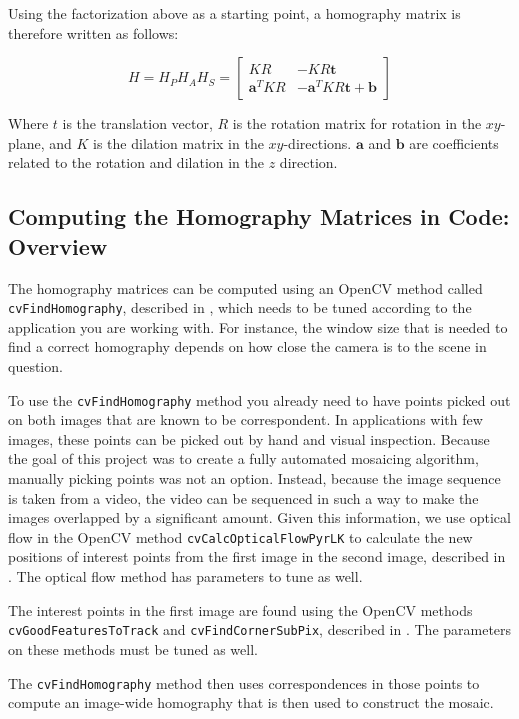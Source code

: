 \documentclass{article}
\begin{document}
Using the factorization above as a starting point, a homography matrix is
therefore written as follows:

\[H = H_P H_A H_S = \begin{bmatrix}KR & -KR\mathbf{t} \\ \mathbf{a}^TKR &
 -\mathbf{a}^TKR\mathbf{t} + \mathbf{b} \end{bmatrix}\] 

Where $t$ is the translation vector, $R$ is the rotation matrix for rotation in
the $xy$-plane, and $K$ is the dilation matrix in the $xy$-directions.
$\mathbf{a}$ and $\mathbf{b}$ are coefficients related to the rotation and
dilation in the $z$ direction.

\subsection{Computing the Homography Matrices in Code: Overview}

The homography matrices can be computed using an OpenCV method called
\verb|cvFindHomography|, described in \cite{cvhomogs}, which needs to be tuned
according to the application you are working with. For instance, the window
size that is needed to find a correct homography depends on how close the
camera is to the scene in question. 

To use the \verb|cvFindHomography| method you already need to have points
picked out on both images that are known to be correspondent. In applications
with few images, these points can be picked out by hand and visual inspection.
Because the goal of this project was to create a fully automated mosaicing
algorithm, manually picking points was not an option. Instead, because the
image sequence is taken from a video, the video can be sequenced in such a way
to make the images overlapped by a significant amount. Given this information,
we use optical flow in the OpenCV method \verb|cvCalcOpticalFlowPyrLK| to
calculate the new positions of interest points from the first image in the
second image, described in \cite{opticalflow}. The optical flow method has parameters to tune as well. 

The interest points in the first image are found using the OpenCV methods
\verb|cvGoodFeaturesToTrack| and \verb|cvFindCornerSubPix|, described in
\cite{points}. The parameters on these methods must be tuned as well. 

The \verb|cvFindHomography| method then uses correspondences in those points to
compute an image-wide homography that is then used to construct the mosaic. 
\end{document}
